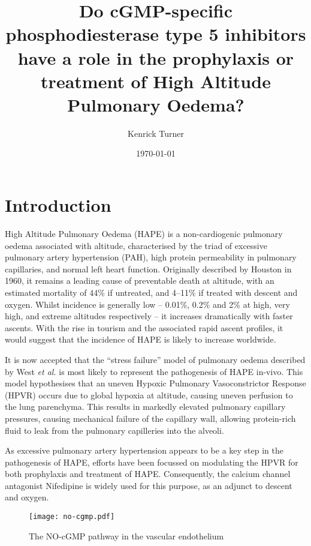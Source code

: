\documentclass[10pt,a4paper]{article}
\title{Do cGMP-specific phosphodiesterase type 5 inhibitors have a role in the prophylaxis or treatment of High Altitude Pulmonary Oedema?}
\author{Kenrick Turner}
\date{\today}
\begin{document}
\maketitle


\section*{Introduction}


High Altitude Pulmonary Oedema (HAPE) is a non-cardiogenic pulmonary oedema associated with altitude, characterised by the triad of excessive pulmonary artery hypertension (PAH), high protein permeability in pulmonary capillaries, and normal left heart function.\cite{Fred:1962hy,Roy:1969tt,Schoene:1988tz} Originally described by Houston in 1960, it remains a leading cause of preventable death at altitude, with an estimated mortality of 44\% if untreated, and 4--11\% if treated with descent and oxygen.\cite{HOUSTON:1960gz,Lobenhoffer:1982eg,MENON:1965gk} Whilst incidence is generally low -- 0.01\%, 0.2\% and 2\% at high, very high, and extreme altitudes respectively -- it increases dramatically with faster ascents.\cite{Bartsch:2002cg} With the rise in tourism and the associated rapid ascent profiles, it would suggest that the incidence of HAPE is likely to increase worldwide.

It is now accepted that the ``stress failure'' model of pulmonary oedema described by West \emph{et al.} is most likely to represent the pathogenesis of HAPE in-vivo.\cite{Maggiorini:2001vq} This model hypothesises that an uneven Hypoxic Pulmonary Vasoconstrictor Response (HPVR) occurs due to global hypoxia at altitude, causing uneven perfusion to the lung parenchyma. This results in markedly elevated pulmonary capillary pressures, causing mechanical failure of the capillary wall, allowing protein-rich fluid to leak from the pulmonary capilleries into the alveoli.\cite{West:1991vc,West:1995tg}

As excessive pulmonary artery hypertension appears to be a key step in the pathogenesis of HAPE, efforts have been focussed on modulating the HPVR for both prophylaxis and treatment of HAPE. Consequently, the calcium channel antagonist Nifedipine is widely used for this purpose, as an adjunct to descent and oxygen.\cite{Luks:2010ht}

\begin{figure}[!hb]
\centering
\texttt{[image: no-cgmp.pdf]}
\caption{The NO-cGMP pathway in the vascular endothelium\cite{Archer:2009cx}}
\label{fig:no-cgmp_pathway}
\end{figure}
\end{document}
